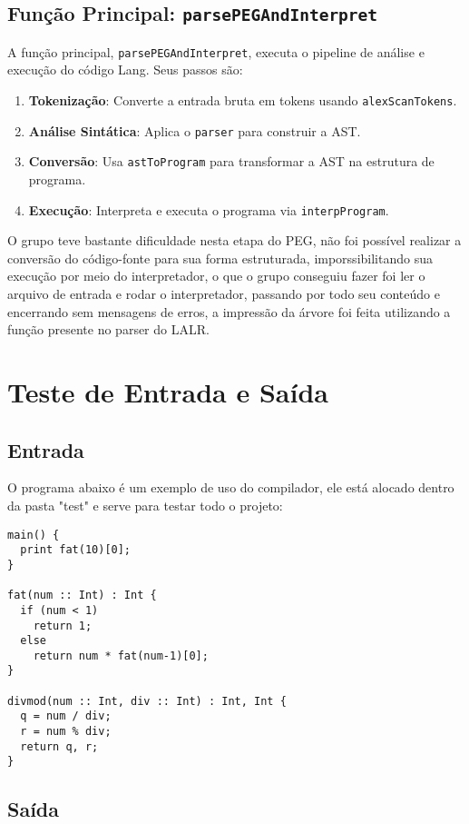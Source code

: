 \documentclass{article}
\begin{document}
\subsection{Função Principal: \texttt{parsePEGAndInterpret}}
A função principal, \texttt{parsePEGAndInterpret}, executa o pipeline de análise e execução do código Lang. Seus passos são:
\begin{enumerate}
    \item \textbf{Tokenização}: Converte a entrada bruta em tokens usando \texttt{alexScanTokens}.
    \item \textbf{Análise Sintática}: Aplica o \texttt{parser} para construir a AST.
    \item \textbf{Conversão}: Usa \texttt{astToProgram} para transformar a AST na estrutura de programa.
    \item \textbf{Execução}: Interpreta e executa o programa via \texttt{interpProgram}.
\end{enumerate}

O grupo teve bastante dificuldade nesta etapa do PEG, não foi possível realizar a conversão do código-fonte para sua forma estruturada, imporssibilitando sua execução por meio do interpretador, o que o grupo conseguiu fazer foi ler o arquivo de entrada e rodar o interpretador, passando por todo seu conteúdo e encerrando sem mensagens de erros, a impressão da árvore foi feita utilizando a função presente no parser do LALR.


\section{Teste de Entrada e Saída}
\subsection{Entrada}
O programa abaixo é um exemplo de uso do compilador, ele está alocado dentro da pasta "test" e serve para testar todo o projeto:


\begin{verbatim}
main() {
  print fat(10)[0];
}

fat(num :: Int) : Int {
  if (num < 1)
    return 1;
  else
    return num * fat(num-1)[0];
}

divmod(num :: Int, div :: Int) : Int, Int {
  q = num / div;
  r = num % div;
  return q, r;
}
\end{verbatim}

\subsection{Saída}
\end{document}
